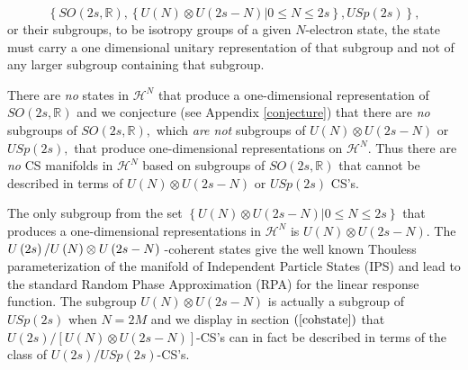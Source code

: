 \documentclass[aps,preprint]{revtex4}%
\begin{document}
\begin{equation}
\left\{  SO\left(  2s,\mathbb{R}\right)  ,\left\{  \left.  U\left(  N\right)
\otimes U\left(  2s-N\right)  \right\vert 0\leq N\leq2s\right\}  ,USp\left(
2s\right)  \right\}  ,
\end{equation}
or their subgroups, to be isotropy groups of a given $N$-electron state, the
state must carry a one dimensional unitary representation of that subgroup and
not of any larger subgroup containing that subgroup.

There are \emph{no} states in $\mathcal{H}^{N}$ that produce a one-dimensional
representation of $SO\left(  2s,\mathbb{R}\right)  $ and we conjecture (see
Appendix \ref{conjecture}) that there are \emph{no }subgroups of $SO\left(
2s,\mathbb{R}\right)  ,$ which \emph{are not} subgroups of $U\left(  N\right)
\otimes U\left(  2s-N\right)  $ or $USp\left(  2s\right)  ,$ that produce
one-dimensional representations on $\mathcal{H}^{N}$. Thus there are \emph{no
}CS manifolds in $\mathcal{H}^{N}$ based on subgroups of $SO\left(
2s,\mathbb{R}\right)  $ that cannot be described in terms of $U\left(
N\right)  \otimes U\left(  2s-N\right)  $ or $USp\left(  2s\right)  $ CS's.

The only subgroup from the set $\left\{  \left.  U\left(  N\right)  \otimes
U\left(  2s-N\right)  \right\vert 0\leq N\leq2s\right\}  $ that produces a
one-dimensional representations in $\mathcal{H}^{N}$ is $U\left(  N\right)
\otimes U\left(  2s-N\right)  .$ The $U\left(  2s\right)  \left/  U\left(
N\right)  \otimes U\left(  2s-N\right)  \overset{}{}\right.  $-coherent states
give the well known Thouless parameterization \cite{Thouless60} of the
manifold of Independent Particle States (IPS) and lead to the standard Random
Phase Approximation (RPA) for the linear response function. The subgroup
$U\left(  N\right)  \otimes U\left(  2s-N\right)  $ is actually a subgroup of
$USp\left(  2s\right)  $ when $N=2M$ and we display in section $\left(
\ref{cohstate}\right)  $ that $U\left(  2s\right)  /\left[  U\left(  N\right)
\otimes U\left(  2s-N\right)  \right]  $-CS's can in fact be described in
terms of the class of $U\left(  2s\right)  /USp\left(  2s\right)  $-CS's.
\end{document}
